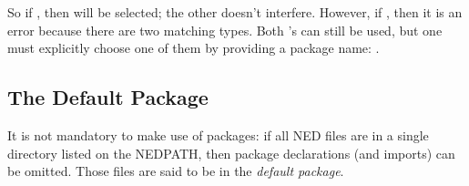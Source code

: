 So if , then
 will be selected; the other
 doesn't interfere. However, if
, then it is an error because there are two
matching  types. Both 's can still be used,
but one must explicitly choose one of them by providing a package name:
.


\subsection{The Default Package}
\label{sec:ned-lang:default-package}

It is not mandatory to make use of packages: if all NED files are in a
single directory listed on the NEDPATH, then package declarations (and
imports) can be omitted. Those files are said to be in the \textit{default
package}.






